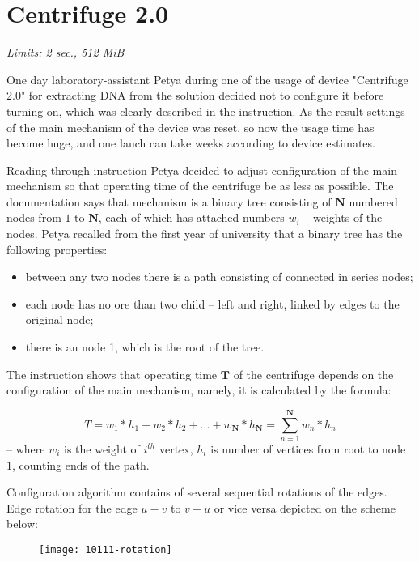 \documentclass [11pt, a4paper, oneside, notitlepage] {article}
\begin{document}
\section*{Centrifuge 2.0}
\hspace{1cm}
\emph{Limits: 2 sec., 512 MiB}
\bigskip


One day laboratory-assistant Petya during one of the usage of device "Centrifuge 2.0" for extracting DNA from the solution decided not to configure it before turning on, which was clearly described in the instruction.
As the result settings of the main mechanism of the device was reset, so now the usage time has become huge, and one lauch can take weeks according to device estimates.

Reading through instruction Petya decided to adjust configuration of the main mechanism so that operating time of the centrifuge be as less as possible. The documentation says that mechanism is a binary tree consisting of $\mathbf{N}$ numbered nodes from $1$ to $\mathbf{N}$, each of which has attached numbers $w_i$ -- weights of the nodes. Petya recalled from the first year of university that a binary tree has the following properties:

\begin{itemize}
    \item between any two nodes there is a path consisting of connected in series nodes;
    \item each node has no ore than two child -- left and right, linked by edges to the original node;
    \item there is an node 1, which is the root of the tree.
\end{itemize}

The instruction shows that operating time $\mathbf{T}$ of the centrifuge depends on the configuration of the main mechanism, namely, it is calculated by the formula:

$$
T = w_1 * h_1 + w_2 * h_2 + ... + w_{\mathbf{N}} * h_{\mathbf{N}} = \sum_{n = 1}^{\mathbf{N}} w_n * h_n 
$$
-- where $w_i$ is the weight of $i^{th}$ vertex, $h_i$ is number of vertices from root to node $1$, counting ends of the path.

Configuration algorithm contains of several sequential rotations of the edges. Edge rotation for the edge $u - v$ to $v - u$ or vice versa depicted on the scheme below:

\begin{figure}[h]
\texttt{[image: 10111-rotation]}
\centering
\end{figure}
\end{document}
